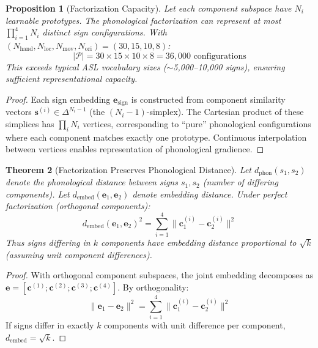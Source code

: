\documentclass{article}
\newtheorem{theorem}{Theorem}[section]
\newtheorem{proposition}[theorem]{Proposition}
\theoremstyle{definition}
\theoremstyle{remark}
\begin{document}
\begin{proposition}[Factorization Capacity]
\label{prop:capacity}
Let each component subspace have $N_i$ learnable prototypes. The phonological factorization can represent at most $\prod_{i=1}^{4} N_i$ distinct sign configurations. With $(N_{\text{hand}}, N_{\text{loc}}, N_{\text{mov}}, N_{\text{ori}}) = (30, 15, 10, 8)$:
\begin{equation}
|\mathcal{P}| = 30 \times 15 \times 10 \times 8 = 36,000 \text{ configurations}
\end{equation}
This exceeds typical ASL vocabulary sizes ($\sim$5,000--10,000 signs), ensuring sufficient representational capacity.
\end{proposition}

\begin{proof}
Each sign embedding $\mathbf{e}_{\text{sign}}$ is constructed from component similarity vectors $\mathbf{s}^{(i)} \in \Delta^{N_i-1}$ (the $(N_i-1)$-simplex). The Cartesian product of these simplices has $\prod_i N_i$ vertices, corresponding to ``pure'' phonological configurations where each component matches exactly one prototype. Continuous interpolation between vertices enables representation of phonological gradience.
\end{proof}

\begin{theorem}[Factorization Preserves Phonological Distance]
\label{thm:distance}
Let $d_{\text{phon}}(s_1, s_2)$ denote the phonological distance between signs $s_1, s_2$ (number of differing components). Let $d_{\text{embed}}(\mathbf{e}_1, \mathbf{e}_2)$ denote embedding distance. Under perfect factorization (orthogonal components):
\begin{equation}
d_{\text{embed}}(\mathbf{e}_1, \mathbf{e}_2)^2 = \sum_{i=1}^{4} \|\mathbf{c}_1^{(i)} - \mathbf{c}_2^{(i)}\|^2
\end{equation}
Thus signs differing in $k$ components have embedding distance proportional to $\sqrt{k}$ (assuming unit component differences).
\end{theorem}

\begin{proof}
With orthogonal component subspaces, the joint embedding decomposes as $\mathbf{e} = [\mathbf{c}^{(1)}; \mathbf{c}^{(2)}; \mathbf{c}^{(3)}; \mathbf{c}^{(4)}]$. By orthogonality:
\begin{equation}
\|\mathbf{e}_1 - \mathbf{e}_2\|^2 = \sum_{i=1}^{4} \|\mathbf{c}_1^{(i)} - \mathbf{c}_2^{(i)}\|^2
\end{equation}
If signs differ in exactly $k$ components with unit difference per component, $d_{\text{embed}} = \sqrt{k}$.
\end{proof}
\end{document}
